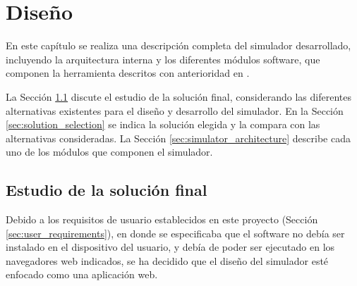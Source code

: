 \chead[]{}
\renewcommand{\headrulewidth}{0.5pt}

\lfoot[]{}
\cfoot[]{}
\rfoot[]{}
\renewcommand{\footrulewidth}{0pt}

\chapter{Diseño}
\label{ch:design}

En este capítulo se realiza una descripción completa del simulador desarrollado, incluyendo la arquitectura interna y los diferentes módulos software, que componen la herramienta descritos con anterioridad en \cite{mateos2016wepsim}.

La Sección \ref{sec:study_of_solution} discute el estudio de la solución final, considerando las diferentes alternativas existentes para el diseño y desarrollo del simulador. En la Sección \ref{sec:solution_selection} se indica la solución elegida y la compara con las alternativas consideradas. La Sección \ref{sec:simulator_architecture} describe cada uno de los módulos que componen el simulador.

\section{Estudio de la solución final}
\label{sec:study_of_solution}

Debido a los requisitos de usuario establecidos en este proyecto (Sección \ref{sec:user_requirements}), en donde se especificaba que el software no debía ser instalado en el dispositivo del usuario, y debía de poder ser ejecutado en los navegadores web indicados, se ha decidido que el diseño del simulador esté enfocado como una aplicación web.

